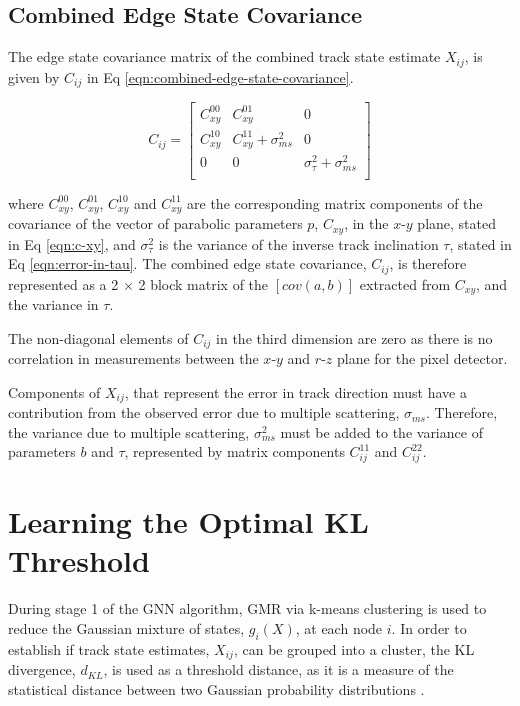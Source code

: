 \subsection{Combined Edge State Covariance}

The edge state covariance matrix of the combined track state estimate $X_{ij}$, is given by $C_{ij}$ in Eq \eqref{eqn:combined-edge-state-covariance}.

\begin{equation}
    C_{ij} = \begin{bmatrix} 
            C_{xy}^{00} & C_{xy}^{01} & 0 \\ 
            C_{xy}^{10} & C_{xy}^{11} + \sigma_{ms}^2 & 0 \\ 
            0 & 0 & \sigma_{\tau}^{2} + \sigma_{ms}^2 \\
            \end{bmatrix} 
    \label{eqn:combined-edge-state-covariance}
\end{equation}

where $C_{xy}^{00}$, $C_{xy}^{01}$, $C_{xy}^{10}$ and $C_{xy}^{11}$ are the corresponding matrix components of the covariance of the vector of parabolic parameters $p$, $C_{xy}$, in the $x$-$y$ plane, stated in Eq \eqref{eqn:c-xy}, and $\sigma_{\tau}^2$ is the variance of the inverse track inclination $\tau$, stated in Eq \eqref{eqn:error-in-tau}. The combined edge state covariance, $C_{ij}$, is therefore represented as a 2 $\times$ 2 block matrix of the $[cov(a, b)]$ extracted from $C_{xy}$, and the variance in $\tau$.

The non-diagonal elements of $C_{ij}$ in the third dimension are zero as there is no correlation in measurements between the $x$-$y$ and $r$-$z$ plane for the pixel detector.

Components of $X_{ij}$, that represent the error in track direction must have a contribution from the observed error due to multiple scattering, $\sigma_{ms}$. Therefore, the variance due to multiple scattering, $\sigma_{ms}^2$ must be added to the variance of parameters $b$ and $\tau$, represented by matrix components $C_{ij}^{11}$ and $C_{ij}^{22}$.




\section{Learning the Optimal KL Threshold}
\label{chapter-6-kl-threshold}

During stage 1 of the GNN algorithm, GMR via k-means clustering is used to reduce the Gaussian mixture of states, $g_i(X)$, at each node $i$. In order to establish if track state estimates, $X_{ij}$, can be grouped into a cluster, the KL divergence, $d_{KL}$, is used as a threshold distance, as it is a measure of the statistical distance between two Gaussian probability distributions \cite{KL, FRUHWIRTH19971}.

